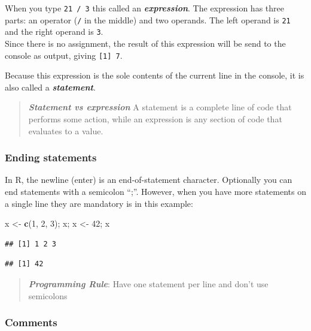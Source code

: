 \documentclass[]{book}
\newenvironment{Shaded}{\begin{snugshade}}{\end{snugshade}}
\newcommand{\DecValTok}[1]{\textcolor[rgb]{0.00,0.00,0.81}{#1}}
\newcommand{\KeywordTok}[1]{\textcolor[rgb]{0.13,0.29,0.53}{\textbf{#1}}}
\newcommand{\NormalTok}[1]{#1}
\newcommand{\StringTok}[1]{\textcolor[rgb]{0.31,0.60,0.02}{#1}}
\begin{document}
When you type \texttt{21\ /\ 3} this called an \textbf{\emph{expression}}. The expression has three parts: an operator (\texttt{/} in the middle) and two operands. The left operand is \texttt{21} and the right operand is \texttt{3}.\\
Since there is no assignment, the result of this expression will be send to the console as output, giving \texttt{{[}1{]}\ 7}.

Because this expression is the sole contents of the current line in the console, it is also called a \textbf{\emph{statement}}.

\begin{quote}
\textbf{\emph{Statement vs expression}} A statement is a complete line of code that performs some action, while an expression is any section of code that evaluates to a value.
\end{quote}

\hypertarget{ending-statements}{%
\subsubsection*{Ending statements}\label{ending-statements}}

In R, the newline (enter) is an end-of-statement character. Optionally you can end statements with a semicolon ``;''. However, when you have more statements on a single line they are mandatory is in this example:

\begin{Shaded}
\begin{Highlighting}[]
\NormalTok{x <-}\StringTok{ }\KeywordTok{c}\NormalTok{(}\DecValTok{1}\NormalTok{, }\DecValTok{2}\NormalTok{, }\DecValTok{3}\NormalTok{); x; x <-}\StringTok{ }\DecValTok{42}\NormalTok{; x}
\end{Highlighting}
\end{Shaded}

\begin{verbatim}
## [1] 1 2 3
\end{verbatim}

\begin{verbatim}
## [1] 42
\end{verbatim}

\begin{quote}
\textbf{\emph{Programming Rule}}: Have one statement per line and don't use semicolons
\end{quote}

\hypertarget{comments}{%
\subsubsection*{Comments}\label{comments}}
\end{document}
